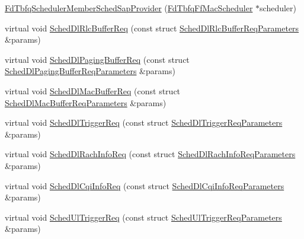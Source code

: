 \begin{DoxyCompactItemize}
\item 
\hyperlink{classns3_1_1FdTbfqSchedulerMemberSchedSapProvider_af3dc2dc2018b3f455aa19953b44121bb}{Fd\+Tbfq\+Scheduler\+Member\+Sched\+Sap\+Provider} (\hyperlink{classns3_1_1FdTbfqFfMacScheduler}{Fd\+Tbfq\+Ff\+Mac\+Scheduler} $\ast$scheduler)
\item 
virtual void \hyperlink{classns3_1_1FdTbfqSchedulerMemberSchedSapProvider_a6a03b380feaa8b2e109c05cce67e3784}{Sched\+Dl\+Rlc\+Buffer\+Req} (const struct \hyperlink{structns3_1_1FfMacSchedSapProvider_1_1SchedDlRlcBufferReqParameters}{Sched\+Dl\+Rlc\+Buffer\+Req\+Parameters} \&params)
\item 
virtual void \hyperlink{classns3_1_1FdTbfqSchedulerMemberSchedSapProvider_a84336a4aeaf95478daa78d42487e4217}{Sched\+Dl\+Paging\+Buffer\+Req} (const struct \hyperlink{structns3_1_1FfMacSchedSapProvider_1_1SchedDlPagingBufferReqParameters}{Sched\+Dl\+Paging\+Buffer\+Req\+Parameters} \&params)
\item 
virtual void \hyperlink{classns3_1_1FdTbfqSchedulerMemberSchedSapProvider_acf91af655604d7bb9cdc08862837d1fa}{Sched\+Dl\+Mac\+Buffer\+Req} (const struct \hyperlink{structns3_1_1FfMacSchedSapProvider_1_1SchedDlMacBufferReqParameters}{Sched\+Dl\+Mac\+Buffer\+Req\+Parameters} \&params)
\item 
virtual void \hyperlink{classns3_1_1FdTbfqSchedulerMemberSchedSapProvider_a1200d11e1f26dee721bd42c3eb773b94}{Sched\+Dl\+Trigger\+Req} (const struct \hyperlink{structns3_1_1FfMacSchedSapProvider_1_1SchedDlTriggerReqParameters}{Sched\+Dl\+Trigger\+Req\+Parameters} \&params)
\item 
virtual void \hyperlink{classns3_1_1FdTbfqSchedulerMemberSchedSapProvider_aac15f9684e59b4d75dde3964ea592ba0}{Sched\+Dl\+Rach\+Info\+Req} (const struct \hyperlink{structns3_1_1FfMacSchedSapProvider_1_1SchedDlRachInfoReqParameters}{Sched\+Dl\+Rach\+Info\+Req\+Parameters} \&params)
\item 
virtual void \hyperlink{classns3_1_1FdTbfqSchedulerMemberSchedSapProvider_a52e48a5a282364c4160b06fbe4c8f595}{Sched\+Dl\+Cqi\+Info\+Req} (const struct \hyperlink{structns3_1_1FfMacSchedSapProvider_1_1SchedDlCqiInfoReqParameters}{Sched\+Dl\+Cqi\+Info\+Req\+Parameters} \&params)
\item 
virtual void \hyperlink{classns3_1_1FdTbfqSchedulerMemberSchedSapProvider_a35689f19a78b8e301b99da93080b6543}{Sched\+Ul\+Trigger\+Req} (const struct \hyperlink{structns3_1_1FfMacSchedSapProvider_1_1SchedUlTriggerReqParameters}{Sched\+Ul\+Trigger\+Req\+Parameters} \&params)

\end{DoxyCompactItemize}
